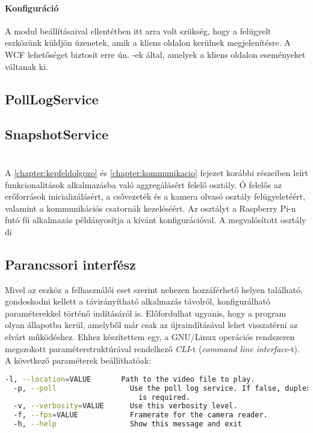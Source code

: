 \paragraph{Konfiguráció} A  modul beállításaival ellentétben itt arra volt szükség, hogy a felügyelt eszközünk küldjön üzenetek, amik a kliens oldalon kerülnek megjelenítésre. A WCF lehetőséget biztosít erre ún. -ek által, amelyek a kliens oldalon eseményeket váltanak ki.

\subsection{PollLogService}

\subsection{SnapshotService}

\section{} \label{section:RpiRemoteHost}

A \ref{chapter:kepfeldolgozo} és \ref{chapter:kommunikacio} fejezet korábbi részeiben leírt funkcionalitások alkalmazásba való aggregálásért felelő osztály. Ő felelős az erőforrások inicializálásért, a csővezeték és a kamera olvasó osztály felügyeletéért, valamint a kommunikációs csatornák kezeléséért. Az osztályt a Raspberry Pi-n futó fű alkalmazás példányosítja a kívánt konfigurációval. A megvalósított osztály di

\subsection{Parancssori interfész}

Mivel az eszköz a felhasználói eset szerint nehezen hozzáférhető helyen található, gondoskodni kellett a távirányítható alkalmazás távolról, konfigurálható paraméterekkel történő indításáról is. Előfordulhat ugyanis, hogy a program olyan állapotba kerül, amelyből már csak az újraindításával lehet visszatérni az elvárt működéshez. Ehhez készítettem egy, a GNU/Linux operációs rendszeren megszokott paraméterstruktúrával rendelkező \emph{CLI}-t (\emph{command line interface}-t). A következő paraméterek beállíthatóak:

\begin{mdframed}[backgroundcolor=gray!20]
\begin{scriptsize}
\begin{lstlisting}[language=bash]
  -l, --location=VALUE       Path to the video file to play.
  -p, --poll                 Use the poll log service. If false, duplex                                          							 binding
                               is required.
  -v, --verbosity=VALUE      Use this verbosity level.
  -f, --fps=VALUE            Framerate for the camera reader.
  -h, --help                 Show this message and exit
\end{lstlisting}
\end{scriptsize}
\end{mdframed}

